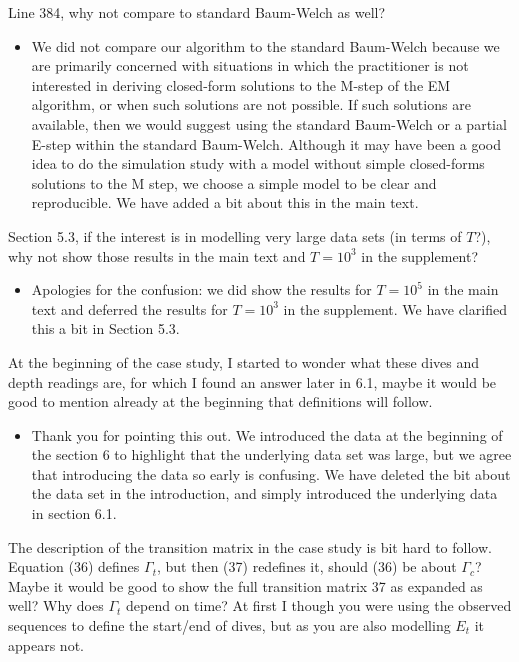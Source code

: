 \documentclass[11pt]{article}
\begin{document}
Line 384, why not compare to standard Baum-Welch as well?

\begin{itemize}
    \item We did not compare our algorithm to the standard Baum-Welch because we are primarily concerned with situations in which the practitioner is not interested in deriving closed-form solutions to the M-step of the EM algorithm, or when such solutions are not possible. If such solutions are available, then we would suggest using the standard Baum-Welch or a partial E-step within the standard Baum-Welch. Although it may have been a good idea to do the simulation study with a model without simple closed-forms solutions to the M step, we choose a simple model to be clear and reproducible. We have added a bit about this in the main text.
\end{itemize}

Section 5.3, if the interest is in modelling very large data sets (in terms of $T$?), why not show those results in the main text and $T=10^3$ in the supplement?

\begin{itemize}
    \item Apologies for the confusion: we did show the results for $T=10^5$ in the main text and deferred the results for $T = 10^3$ in the supplement. We have clarified this a bit in Section 5.3.
\end{itemize}

At the beginning of the case study, I started to wonder what these dives and depth readings are, for which I found an answer later in 6.1, maybe it would be good to mention already at the beginning that definitions will follow.

\begin{itemize}
    \item Thank you for pointing this out. We introduced the data at the beginning of the section 6 to highlight that the underlying data set was large, but we agree that introducing the data so early is confusing. We have deleted the bit about the data set in the introduction, and simply introduced the underlying data in section 6.1.
\end{itemize}

The description of the transition matrix in the case study is bit hard to follow. Equation (36) defines $\Gamma_t$, but then (37) redefines it, should (36) be about $\Gamma_c$? Maybe it would be good to show the full transition matrix 37 as expanded as well? Why does $\Gamma_t$ depend on time? At first I though you were using the observed sequences to define the start/end of dives, but as you are also modelling $E_t$ it appears not. 
\end{document}
